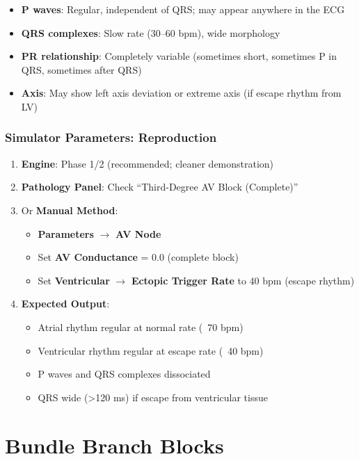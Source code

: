\documentclass[12pt,a4paper,oneside]{book}
\begin{document}
\begin{itemize}
    \item \textbf{P waves}: Regular, independent of QRS; may appear anywhere in the ECG
    \item \textbf{QRS complexes}: Slow rate (30–60 bpm), wide morphology
    \item \textbf{PR relationship}: Completely variable (sometimes short, sometimes P in QRS, sometimes after QRS)
    \item \textbf{Axis}: May show left axis deviation or extreme axis (if escape rhythm from LV)
\end{itemize}

\subsubsection{Simulator Parameters: Reproduction}

\begin{enumerate}
    \item \textbf{Engine}: Phase 1/2 (recommended; cleaner demonstration)
    \item \textbf{Pathology Panel}: Check ``Third-Degree AV Block (Complete)''
    \item Or \textbf{Manual Method}:
    \begin{itemize}
        \item \textbf{Parameters} $\to$ \textbf{AV Node}
        \item Set \textbf{AV Conductance} = 0.0 (complete block)
        \item Set \textbf{Ventricular} $\to$ \textbf{Ectopic Trigger Rate} to 40 bpm (escape rhythm)
    \end{itemize}
    \item \textbf{Expected Output}:
    \begin{itemize}
        \item Atrial rhythm regular at normal rate (~70 bpm)
        \item Ventricular rhythm regular at escape rate (~40 bpm)
        \item P waves and QRS complexes dissociated
        \item QRS wide (>120 ms) if escape from ventricular tissue
    \end{itemize}
\end{enumerate}

\section{Bundle Branch Blocks}
\end{document}
